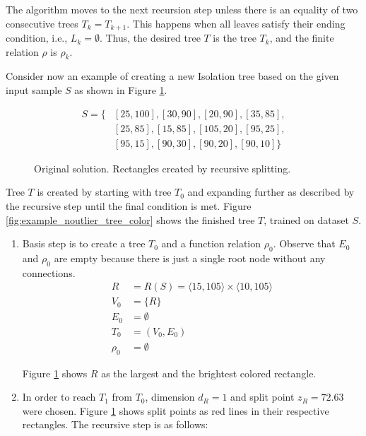 The algorithm moves to the next recursion step unless there is an equality of two consecutive trees \(T_k = T_{k+1}\). This happens when all leaves satisfy their ending condition, i.e., \(L_k = \emptyset\).
Thus, the desired tree $T$ is the tree $T_k$, and the finite relation $\rho$ is $\rho_k$.


\begin{example}
\label{example:original_tree_create}
Consider now an example of creating a new Isolation tree based on the given input sample $S$ as shown in Figure \ref{fig:example_noutlier_gnu}.

\begin{align*}
    S = \{&[25,100],[30,90],[20,90],[35,85],\\
    &[25,85],[15,85],[105,20],[95,25], \\
    &[95,15],[90,30],[90,20],[90,10]\}
\end{align*}


\begin{figure}[htbp]
\centering

\caption{Original solution. Rectangles created by recursive splitting.}
\label{fig:example_noutlier_gnu}
\end{figure}

Tree $T$ is created by starting with tree $T_0$ and expanding further as described by the recursive step until the final condition is met.
Figure \ref{fig:example_noutlier_tree_color} shows the finished tree $T$, trained on dataset $S$.

\begin{enumerate}
    \item Basis step is to create a tree $T_0$ and a function relation $\rho_0$. 
    Observe that $E_0$ and $\rho_0$ are empty because there is just a single root node without any connections.
\begin{align*}
R &= R(S) = \langle 15, 105 \rangle \times \langle 10, 105 \rangle\\
V_0 &= \{R\}\\
E_0 &= \emptyset\\
T_0 &= (V_0, E_0)\\
\rho_0 &= \emptyset
\end{align*}

Figure \ref{fig:example_noutlier_gnu} shows $R$ as the largest and the brightest colored rectangle.

\item In order to reach $T_1$ from $T_0$, dimension $d_R=1$ and split point $z_R = 72.63$ were chosen. Figure \ref{fig:example_noutlier_gnu} shows split points as red lines in their respective rectangles. The recursive step is as follows:


\end{enumerate}
\end{example}
